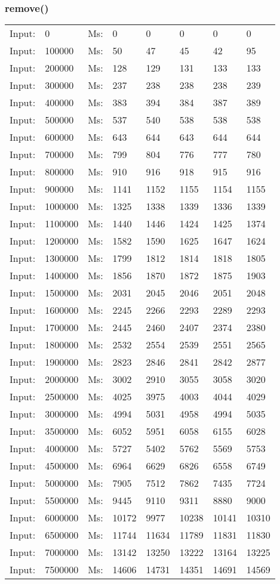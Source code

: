 \documentclass[11pt,a4paper]{report}
\begin{document}
\begin{tiny}
\subsubsection{remove()}
\begin{tabular}{l l ||l  l  l  l  l  l}
Input:&0&Ms:&0&0&0&0&0\\
Input:&100000&Ms:&50&47&45&42&95\\
Input:&200000&Ms:&128&129&131&133&133\\
Input:&300000&Ms:&237&238&238&238&239\\
Input:&400000&Ms:&383&394&384&387&389\\
Input:&500000&Ms:&537&540&538&538&538\\
Input:&600000&Ms:&643&644&643&644&644\\
Input:&700000&Ms:&799&804&776&777&780\\
Input:&800000&Ms:&910&916&918&915&916\\
Input:&900000&Ms:&1141&1152&1155&1154&1155\\
Input:&1000000&Ms:&1325&1338&1339&1336&1339\\
Input:&1100000&Ms:&1440&1446&1424&1425&1374\\
Input:&1200000&Ms:&1582&1590&1625&1647&1624\\
Input:&1300000&Ms:&1799&1812&1814&1818&1805\\
Input:&1400000&Ms:&1856&1870&1872&1875&1903\\
Input:&1500000&Ms:&2031&2045&2046&2051&2048\\
Input:&1600000&Ms:&2245&2266&2293&2289&2293\\
Input:&1700000&Ms:&2445&2460&2407&2374&2380\\
Input:&1800000&Ms:&2532&2554&2539&2551&2565\\
Input:&1900000&Ms:&2823&2846&2841&2842&2877\\
Input:&2000000&Ms:&3002&2910&3055&3058&3020\\
Input:&2500000&Ms:&4025&3975&4003&4044&4029\\
Input:&3000000&Ms:&4994&5031&4958&4994&5035\\
Input:&3500000&Ms:&6052&5951&6058&6155&6028\\
Input:&4000000&Ms:&5727&5402&5762&5569&5753\\
Input:&4500000&Ms:&6964&6629&6826&6558&6749\\
Input:&5000000&Ms:&7905&7512&7862&7435&7724\\
Input:&5500000&Ms:&9445&9110&9311&8880&9000\\
Input:&6000000&Ms:&10172&9977&10238&10141&10310\\
Input:&6500000&Ms:&11744&11634&11789&11831&11830\\
Input:&7000000&Ms:&13142&13250&13222&13164&13225\\
Input:&7500000&Ms:&14606&14731&14351&14691&14569\\
\end{tabular}


\end{tiny}
\end{document}
